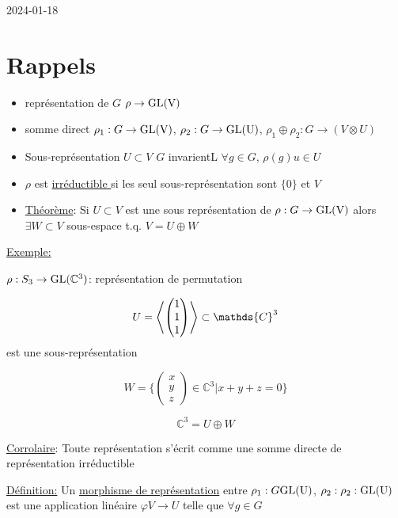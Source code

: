 


2024-01-18

\section*{Rappels}
\begin{itemize}
	
	\item représentation de $G$ $\rho \to \rm{GL}(V)$
	\item somme direct $\rho_1: G \to \rm{GL}(V)$, $\rho_2 : G \to \rm{GL}(U)$, $\rho_1 \oplus \rho_2 : G \to (V \otimes U)$

	\item Sous-représentation $U \subset V$ 
		$G$ invarientL $\forall g \in G,\, \rho(g) u\in U$

	\item $\rho$ est \underline{irréductible } si les seul sous-représentation sont $\{ 0 \} $ et $V$ 

	\item \underline{Théorème}: Si $U \subset V$ est une sous représentation de $ \rho: G \to \rm{GL}(V)$ alors $\exists W \subset V$ sous-espace t.q. $V = U \oplus W$  

\end{itemize}

\underline{Exemple:} 

$\rho: S_3 \to \rm{GL}(\mathbb{C}^3)$: représentation de permutation

\[ U = \expval{\begin{pmatrix} 1 \\ 1 \\1 \end{pmatrix} } \subset \mathds{C}^{3}\] est une sous-représentation

\[ W = \{ \begin{pmatrix} x\\y\\z  \end{pmatrix} \in \mathds{C}^{3} | x+y+z =0 \} \]


\[ \mathds{C}^{3} = U \oplus W \]


\underline{Corrolaire}: Toute représentation s'écrit comme une somme directe de représentation irréductible 


\underline{Définition:} Un \underline{morphisme de représentation} entre $\rho_{1} : G \rm{GL}(U)$, $ \rho_2 : \rho_2 :\rm{GL}(U) $ est une application linéaire $\varphi V \to U$ telle que $ \forall g \in G$   


